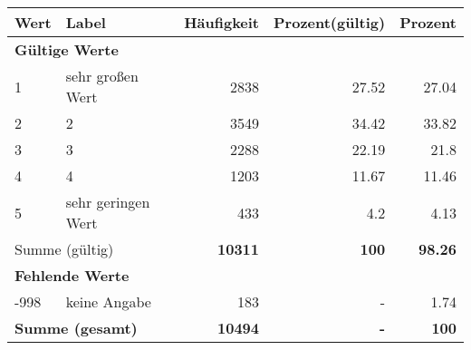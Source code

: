      \begin{longtable}{lXrrr}
     \toprule
     \textbf{Wert} & \textbf{Label} & \textbf{Häufigkeit} & \textbf{Prozent(gültig)} & \textbf{Prozent} \\
     \endhead
     \midrule
     \multicolumn{5}{l}{\textbf{Gültige Werte}}\\

     1 &
     \multicolumn{1}{X}{ sehr großen Wert   } &


       \num{2838} &
       \num[round-mode=places,round-precision=2]{27,52} &
         \num[round-mode=places,round-precision=2]{27,04} \\

     2 &
     \multicolumn{1}{X}{ 2   } &


       \num{3549} &
       \num[round-mode=places,round-precision=2]{34,42} &
         \num[round-mode=places,round-precision=2]{33,82} \\

     3 &
     \multicolumn{1}{X}{ 3   } &


       \num{2288} &
       \num[round-mode=places,round-precision=2]{22,19} &
         \num[round-mode=places,round-precision=2]{21,8} \\

     4 &
     \multicolumn{1}{X}{ 4   } &


       \num{1203} &
       \num[round-mode=places,round-precision=2]{11,67} &
         \num[round-mode=places,round-precision=2]{11,46} \\

     5 &
     \multicolumn{1}{X}{ sehr geringen Wert   } &


       \num{433} &
       \num[round-mode=places,round-precision=2]{4,2} &
         \num[round-mode=places,round-precision=2]{4,13} \\
     \midrule
     \multicolumn{2}{l}{Summe (gültig)} &
       \textbf{\num{10311}} &
     \textbf{100} &
       \textbf{\num[round-mode=places,round-precision=2]{98,26}} \\
     \multicolumn{5}{l}{\textbf{Fehlende Werte}}\\
       -998 &
       keine Angabe &
         \num{183} &
        - &
         \num[round-mode=places,round-precision=2]{1,74} \\
     \midrule
     \multicolumn{2}{l}{\textbf{Summe (gesamt)}} &
          \textbf{\num{10494}} &
        \textbf{-} &
        \textbf{100} \\
     \bottomrule
     \end{longtable}
     
